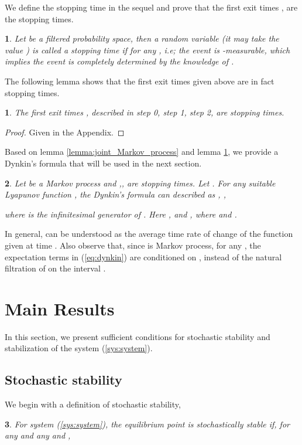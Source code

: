 \documentclass[10.5pt,a4paper]{article}
\theoremstyle{remark}
\theoremstyle{plain}
\theoremstyle{plain}
\newtheorem{defn}{\protect\definitionname}
\theoremstyle{remark}
\theoremstyle{plain}
\theoremstyle{plain}
\newtheorem{lem}{\protect\lemmaname}
\providecommand{\lemmaname}{Lemma}
\providecommand{\definitionname}{Definition}
\begin{document}
\noindent We define the stopping time in the sequel and prove that
the first exit times ,  
are the stopping times.
\begin{defn}
\noindent Let  be a filtered
probability space, then a random variable 
(it may take the value ) is called a stopping time
if  for any , i.e; the event
 is -measurable, which implies the
event  is completely determined by the knowledge of
. \end{defn}

The following lemma shows that the first exit times given above are in fact stopping times.
\begin{lem}
\label{lemma:stopping_time} The first exit times , described in step 0, step 1, step 2,  are stopping times.\end{lem}
\begin{proof}
Given in the Appendix.
\end{proof}

Based on lemma \ref{lemma:joint_Markov_process} and lemma \ref{lemma:stopping_time}, we provide a Dynkin's formula that will be used in the next section.

\begin{defn} Let  be a Markov process
and ,, are stopping times. Let
. For any suitable
Lyapunov function , the Dynkin's formula can described
as \cite{sri}, \cite{karimi},


where  is the infinitesimal generator of .
Here , and , where 
and . \end{defn}
In general,    can be understood as the average time rate of change of the function  given  at time . Also observe that, since  is Markov process, for any , the expectation terms in (\ref{eq:dynkin}) are
conditioned on , instead of the natural filtration of  on the interval .


\section{Main Results\label{section:mainresult} }
In this section, we present sufficient conditions for stochastic stability
and stabilization of the system (\ref{sys:system}). 

\subsection{Stochastic stability}
We begin with a definition of stochastic stability,

\begin{defn} For system (\ref{sys:system}), the equilibrium point
 is \textit{stochastically stable} if, for any 
and any  and ,

\end{defn}
\end{document}
